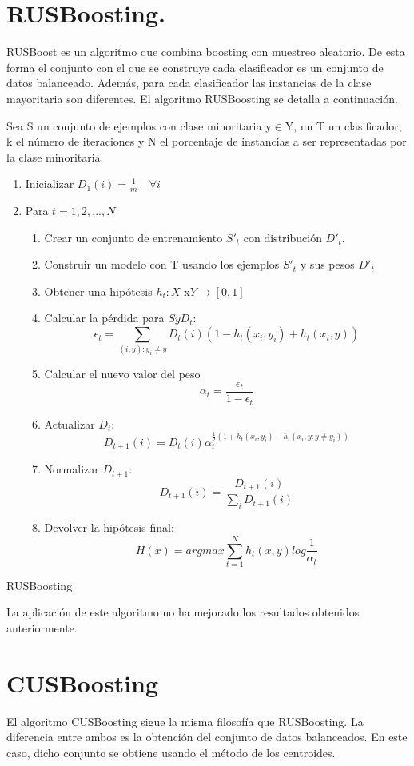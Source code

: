 \section{RUSBoosting.}
RUSBoost es un algoritmo que combina boosting con muestreo aleatorio. De esta forma el conjunto con el que se construye cada clasificador es un conjunto de datos balanceado. Además, para cada clasificador las instancias de la clase mayoritaria son diferentes. El algoritmo RUSBoosting se detalla a continuación.
\begin{algorithm}[H]
	
	Sea S un conjunto de ejemplos con clase minoritaria y$\in$Y, un T un
	clasificador, k el número de iteraciones y N el porcentaje de instancias a ser
	representadas por la clase minoritaria.
	\begin{enumerate}
		\item Inicializar $D_1(i) = \frac{1}{m}\quad \forall i$
		\item Para $t=1,2,...,N$
		\begin{enumerate}
			\item Crear un conjunto de entrenamiento $S'_t$ con distribución $D'_t$.
			\item Construir un modelo con T usando los ejemplos $S'_t$ y sus pesos $D'_t$
			
			\item Obtener una hipótesis $h_t : X$ x$ Y \to [0,1]$
			\item Calcular la pérdida para $S y D_t$:
			$$
			\epsilon_t = \sum_{(i,y):y_i\neq y} D_t(i)(1-h_t(x_i,y_i)+h_t(x_i,y))
			$$
			\item Calcular el nuevo valor del peso
			$$\alpha_t = \frac{\epsilon_t}{1-\epsilon_t}$$
			\item Actualizar $D_t$:
			$$
			D_{t+1} (i) = D_t(i) \alpha_t^{\frac{1}{2}(1+h_t(x_i,y_i)-h_t(x_i,y:y\neq
				y_i))}
			$$		
			\item Normalizar $D_{t+1}$:
			$$
			D_{t+1}(i) = \frac{D_{t+1}(i)}{\sum_{i}D_{t+1}(i)}
			$$
			\item Devolver la hipótesis final:
			$$
			H(x) = argmax \sum_{t=1}^{N}h_t(x,y)log\frac{1}{\alpha_t}
			$$
		\end{enumerate}
	\end{enumerate} 
	\caption{RUSBoosting}
\end{algorithm}

La aplicación de este algoritmo no ha mejorado los resultados obtenidos anteriormente.

\section{CUSBoosting}
El algoritmo CUSBoosting sigue la misma filosofía que RUSBoosting. La diferencia entre ambos es la obtención del conjunto de datos balanceados. En este caso, dicho conjunto se obtiene usando el método de los centroides.
\medskip

